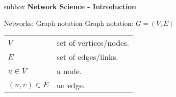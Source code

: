 \begin{subbox}{subbox}{}
    \centering
    \Large{\textbf{Network Science -  Introduction}}
\end{subbox}


\begin{textbox}{Networks: Graph notation}
    Graph notation: $G=(V,E)$

    \begin{tabular}{p{}|p{}}\scriptsize
        $V$           & set of vertices/nodes. \\
        $E$           & set of edges/links.    \\
        $u\in V$      & a node.                \\
        $(u,v) \in E$ & an edge.               \\
    \end{tabular}
\end{textbox}


